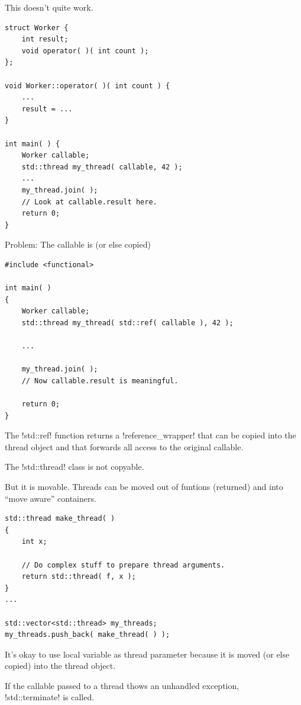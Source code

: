 \documentclass[landscape]{slides}
\begin{document}

This doesn't quite work.
\vspace{5mm}
{\small
\begin{lstlisting}
struct Worker {
    int result;
    void operator( )( int count );
};

void Worker::operator( )( int count ) {
    ...
    result = ...
}

int main( ) {
    Worker callable;
    std::thread my_thread( callable, 42 );
    ...
    my_thread.join( );
    // Look at callable.result here.
    return 0;
}
\end{lstlisting}
}
\stopslide


Problem: The callable is  (or else copied)
\vspace{5mm}
{\small
\begin{lstlisting}
#include <functional>

int main( )
{
    Worker callable;
    std::thread my_thread( std::ref( callable ), 42 );

    ...

    my_thread.join( );
    // Now callable.result is meaningful.

    return 0;
}
\end{lstlisting}
}
The !std::ref! function returns a !reference_wrapper! that can be copied into the thread object
and that forwards all access to the original callable.
\stopslide


The !std::thread! class is not copyable. 

But it is movable. Threads can be moved out of funtions (returned) and into ``move aware''
containers.
\vspace{5mm}
{\small
\begin{lstlisting}
std::thread make_thread( )
{
    int x;

    // Do complex stuff to prepare thread arguments.
    return std::thread( f, x );
}
...

std::vector<std::thread> my_threads;
my_threads.push_back( make_thread( ) );
\end{lstlisting}
}
It's okay to use local variable as thread parameter because it is moved (or else copied) into
the thread object.
\stopslide


If the callable passed to a thread thows an unhandled exception,\\
!std::terminate! is called.
\end{document}
